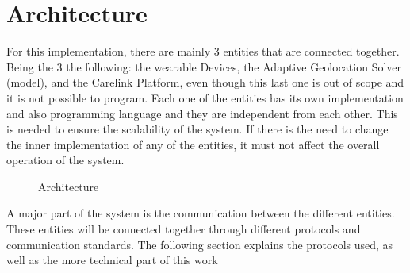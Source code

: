 


\section{Architecture}
\label{sec:Architecture}

For this implementation, there are mainly 3  entities that are connected together. Being the 3 the following: the wearable Devices, the Adaptive Geolocation Solver (model), and the Carelink Platform,  even though this last one is out of scope and it is not possible to program.
Each one of the entities has its own implementation and also programming language and they are independent from each other.
This is needed to ensure the scalability of the system.
If there is the need to change the inner implementation of any of the entities, it must not affect the overall operation of the system.

\begin{figure}[htbp]
  \centering
 
  \caption{Architecture}
  \label{fig:Arch}
\end{figure}


A major part of the system is the communication between the different entities.
These entities will be connected together through different protocols and communication standards. The following section explains the protocols used, as well as the more technical part of this work

